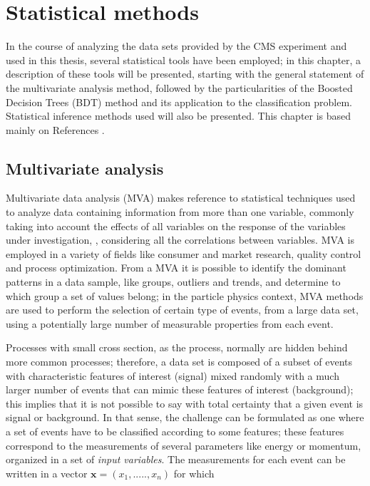 \chapter{Statistical methods}\label{ch:stat}

In the course of analyzing the data sets provided by the CMS experiment and used in this thesis, several statistical tools have been employed; in this chapter, a description of these tools will be presented, starting with the general statement of the multivariate analysis method, followed by the particularities of the Boosted Decision Trees (BDT) method and its application to the classification problem. Statistical inference methods used will also be presented. This chapter is based mainly on References \cite{mva, tmva, luca}.      

\section{Multivariate analysis}\label{sec:mva}

Multivariate data analysis (MVA) makes reference to statistical techniques used to analyze data containing information from more than one variable, commonly taking into account the effects of all variables on the response of the variables under investigation, \ie, considering all the correlations between variables. MVA is employed in a variety of fields like consumer and market research, quality control and process optimization. From a MVA it is possible to identify the dominant patterns in a data sample, like groups, outliers and trends, and determine to which group a set of values belong; in the particle physics context, MVA methods are used to perform the selection of certain type of events, from a large data set, using a potentially large number of measurable properties from each event.

Processes with small cross section, as the \tHq process, normally are hidden behind more common processes; therefore, a data set is composed of a subset of events with characteristic features of interest (signal) mixed randomly with a much larger number of events that can mimic these features of interest (background); this implies that it is not possible to say with total certainty that a given event is signal or background. In that sense, the challenge can be formulated as one where a set of events have to be classified according to some features; these features correspond to the measurements of several parameters like energy or momentum, organized in a set of \textit{input variables}. The measurements for each event can be written in a vector $\textbf{x}=(x_1,.....,x_n)$ for which


